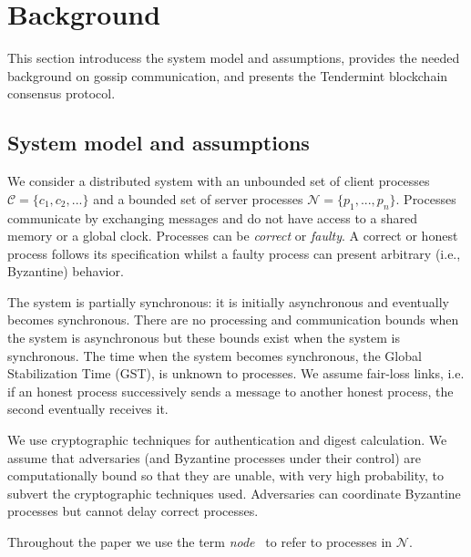 
\section{Background}
\label{sec:background}

This section introducess the system model and assumptions, provides the needed background 
on gossip communication, and presents the Tendermint blockchain consensus protocol.

\subsection{System model and assumptions}
\label{sec:model}

We consider a distributed system with an unbounded set of client processes $\mathcal{C} = \{ c_1, c_2, ... \}$ and a bounded set of server processes $\mathcal{N} = \{ p_1, ..., p_n \}$.
Processes communicate by exchanging messages and do not have access to a shared memory or a global clock. 
Processes can be \emph{correct} or \emph{faulty}. 
A correct or honest process follows its specification whilst a faulty process can present arbitrary (i.e., Byzantine) behavior. 

The system is partially synchronous: it is initially asynchronous and eventually becomes synchronous. 
There are no processing and communication bounds when the system is asynchronous but these bounds exist when the system is synchronous.
The time when the system becomes synchronous, the Global Stabilization Time (GST), is unknown to processes.   We assume fair-loss links, i.e. if an honest process successively sends a message to another honest process, the second eventually receives it.

We use cryptographic techniques for authentication and digest calculation. 
We assume that adversaries (and Byzantine processes under their control) are computationally bound so that they are unable, with very high probability, to subvert the cryptographic techniques used. 
Adversaries can coordinate Byzantine processes but cannot delay correct processes.


\newcommand{\node}{{node~}}
\newcommand{\nodes}{{nodes~}}

Throughout the paper we use the term \textit{\node} to refer to processes in $\mathcal{N}$.



